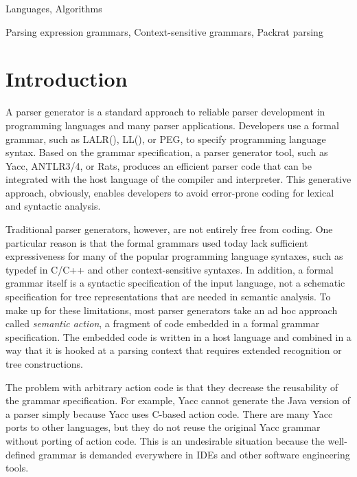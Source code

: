 \documentclass[preprint]{sigplanconf}
\begin{document}

\terms
Languages, Algorithms

\keywords
Parsing expression grammars, Context-sensitive grammars, Packrat parsing

\section{Introduction}

A parser generator is a standard approach to reliable parser development in programming languages and many parser applications. Developers use a formal grammar, such as LALR(), LL(), or PEG, to specify programming language syntax. Based on the grammar specification, a parser generator tool, such as Yacc\cite{Yacc}, ANTLR3/4\cite{PLDI11_Antlr}, or Rats\cite{PLDI06_Rats}, produces an efficient parser code that can be integrated with the host language of the compiler and interpreter. This generative approach, obviously, enables developers to avoid error-prone coding for lexical and syntactic analysis. 

Traditional parser generators, however, are not entirely free from coding. One particular reason is that the formal grammars used today lack sufficient expressiveness for many of the popular programming language syntaxes, such as typedef in C/C++ and other context-sensitive syntaxes\cite{POPL04_PEG,PLDI06_Rats,ONWARD15_Iguana}. In addition, a formal grammar itself is a syntactic specification of the input language, not a schematic specification for tree representations that are needed in semantic analysis. To make up for these limitations, most parser generators take an ad hoc approach called {\em semantic action}, a fragment of code embedded in a formal grammar specification. The embedded code is written in a host language and combined in a way that it is hooked at a parsing context that requires extended recognition or tree constructions. 

The problem with arbitrary action code is that they decrease the reusability of the grammar specification\cite{ICPC08_SemanticActions}. For example, Yacc cannot generate the Java version of a parser simply because Yacc uses C-based action code. There are many Yacc ports to other languages, but they do not reuse the original Yacc grammar without porting of action code. This is an undesirable situation because the well-defined grammar is demanded everywhere in IDEs and other software engineering tools\cite{OOPSLA11_Spoofax}. 
\end{document}
